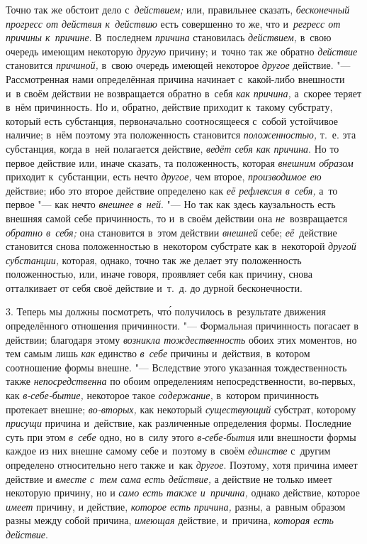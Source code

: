 Точно так же обстоит дело с~{\em действием;} или, правильнее сказать,
{\em бесконечный прогресс от действия к~действию} есть совершенно то же, что
и~{\em регресс от причины к~причине}. В~последнем {\em причина} становилась
{\em действием,} в~свою очередь имеющим некоторую {\em другую} причину; и~точно
так же обратно {\em действие} становится {\em причиной,} в~свою очередь имеющей
некоторое {\em другое} действие. "--- Рассмотренная нами определённая причина
начинает с~какой-либо внешности и~в своём действии не возвращается обратно
в~себя {\em как причина,} а~скорее теряет в~нём причинность. Но и, обратно,
действие приходит к~такому субстрату, который есть субстанция, первоначально
соотносящееся с~собой устойчивое наличие; в~нём поэтому эта положенность
становится {\em положенностью,} т.~е. эта субстанция, когда в~ней полагается
действие, {\em ведёт себя как причина}. Но то первое действие или, иначе
сказать, та положенность, которая {\em внешним образом} приходит к~субстанции,
есть нечто {\em другое,} чем второе, {\em производимое ею} действие; ибо это
второе действие определено как {\em её рефлексия} {\em в~себя,} а~то первое
"--- как нечто {\em внешнее в~ней}. "--- Но так как здесь каузальность есть
внешняя самой себе причинность, то и~в своём действии она {\em не}~возвращается
{\em обратно в~себя;} она становится в~этом действии {\em внешней} себе;
{\em её}~действие становится снова положенностью в~некотором субстрате как
в~некоторой {\em другой субстанции,} которая, однако, точно так же делает эту
положенность положенностью, или, иначе говоря, проявляет себя как причину,
снова отталкивает от себя своё действие и~т.~д. до дурной бесконечности.

3. Теперь мы должны посмотреть, чт\'{о} получилось в~результате движения
определённого отношения причинности. "--- Формальная причинность погасает в
действии; благодаря этому {\em возникла тождественность} обоих этих моментов,
но тем самым лишь {\em как} единство {\em в~себе} причины и~действия, в~котором
соотношение формы внешне. "--- Вследствие этого указанная тождественность также
{\em непосредственна} по обоим определениям непосредственности, во-первых, как
{\em в-себе-бытие,} некоторое такое {\em содержание,} в~котором причинность
протекает внешне; {\em во-вторых,} как некоторый {\em существующий} субстрат,
которому {\em присущи} причина и~действие, как различенные определения формы.
Последние суть при этом {\em в~себе} одно, но в~силу этого {\em в-себе-бытия}
или внешности формы каждое из них внешне самому себе и~поэтому в~своём
{\em единстве} с~другим определено относительно него также и~как {\em другое}.
Поэтому, хотя причина имеет действие и {\em вместе с~тем сама есть действие,}
а действие не только имеет некоторую причину, но и
{\em само есть также и~причина,} однако действие, которое {\em имеет} причину,
и действие, {\em которое есть причина,} разны, а~равным образом разны между
собой причина, {\em имеющая} действие, и~причина, {\em которая есть действие}.

